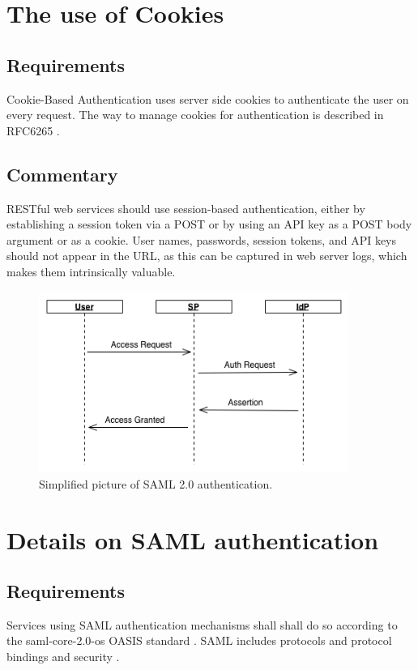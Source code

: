 \documentclass[11pt,a4paper]{ivoa}
\begin{document}
\section{The use of Cookies}
\subsection{Requirements}
Cookie-Based Authentication uses server side cookies to authenticate the user on every request. 
The way to manage  cookies for authentication is described in RFC6265 \citep{std:RFC6265}.

\subsection{Commentary}
RESTful web services should use session-based authentication, either by establishing a session token via a POST or
by using an API key as a POST body argument or as a cookie. 
User names, passwords, session tokens, and API keys should not appear in the URL, 
as this can be captured in web server logs, which makes them intrinsically valuable.
\begin{figure}
\centering
\includegraphics[width=0.9\textwidth]{SSO_image002.png}
\caption{Simplified picture of SAML 2.0 authentication.}
\label{fig:saml}
\end{figure}

\section{Details on SAML authentication}
\subsection{Requirements}
Services using SAML authentication mechanisms shall shall do so according to the 
saml-core-2.0-os OASIS standard \citep{std:SAML}. 
SAML includes protocols and protocol bindings and security \citep{std:SAMLB}.
\end{document}
